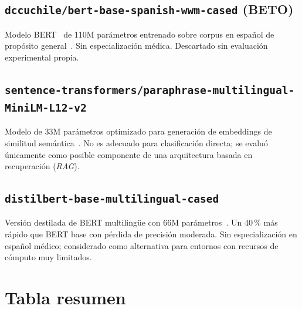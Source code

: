 \subsection{\texttt{dccuchile/bert-base-spanish-wwm-cased} (BETO)}

Modelo BERT~\cite{devlin2019} de 110M parámetros entrenado sobre corpus en español de propósito general~\cite{canete2020beto}. Sin especialización médica. Descartado sin evaluación experimental propia.

\subsection{\texttt{sentence-transformers/paraphrase-multilingual-MiniLM-L12-v2}}

Modelo de 33M parámetros optimizado para generación de embeddings de similitud semántica~\cite{reimers2019sentencebert}. No es adecuado para clasificación directa; se evaluó únicamente como posible componente de una arquitectura basada en recuperación (\emph{RAG}).

\subsection{\texttt{distilbert-base-multilingual-cased}}

Versión destilada de BERT multilingüe con 66M parámetros~\cite{sanh2019distilbert}. Un 40\,\% más rápido que BERT base con pérdida de precisión moderada. Sin especialización en español médico; considerado como alternativa para entornos con recursos de cómputo muy limitados.

\section{Tabla resumen}

